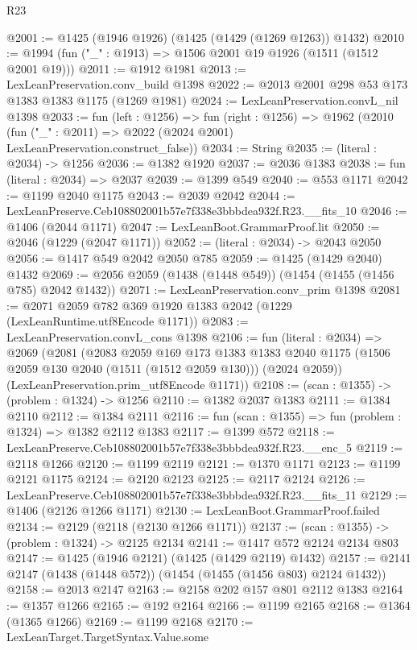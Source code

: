 \begin{lexlean}{R23}
\begin{coremodule}
@2001 := @1425 (@1946 @1926) (@1425 (@1429 (@1269 @1263)) @1432)
@2010 := @1994 (fun ("_" : @1913) => @1506 @2001 @19 @1926 (@1511 (@1512 @2001 @19)))
@2011 := @1912 @1981
@2013 := LexLeanPreservation.conv_build @1398
@2022 := @2013 @2001 @298 @53 @173 @1383 @1383 @1175 (@1269 @1981)
@2024 := LexLeanPreservation.convL_nil @1398
@2033 := fun (left : @1256) =>
  fun (right : @1256) =>
  @1962 (@2010 (fun ("_" : @2011) => @2022 (@2024 @2001) LexLeanPreservation.construct_false))
@2034 := String
@2035 := (literal : @2034) -> @1256
@2036 := @1382 @1920
@2037 := @2036 @1383
@2038 := fun (literal : @2034) => @2037
@2039 := @1399 @549
@2040 := @553 @1171
@2042 := @1199 @2040 @1175
@2043 := @2039 @2042
@2044 := LexLeanPreserve.Ceb108802001b57e7f338e3bbbdea932f.R23.__fits_10
@2046 := @1406 (@2044 @1171)
@2047 := LexLeanBoot.GrammarProof.lit
@2050 := @2046 (@1229 (@2047 @1171))
@2052 := (literal : @2034) -> @2043 @2050
@2056 := @1417 @549 @2042 @2050 @785
@2059 := @1425 (@1429 @2040) @1432
@2069 := @2056 @2059 (@1438 (@1448 @549)) (@1454 (@1455 (@1456 @785) @2042 @1432))
@2071 := LexLeanPreservation.conv_prim @1398
@2081 := @2071 @2059 @782 @369 @1920 @1383 @2042 (@1229 (LexLeanRuntime.utf8Encode @1171))
@2083 := LexLeanPreservation.convL_cons @1398
@2106 := fun (literal : @2034) =>
  @2069
    (@2081
      (@2083
        @2059
        @169
        @173
        @1383
        @1383
        @2040
        @1175
        (@1506 @2059 @130 @2040 (@1511 (@1512 @2059 @130)))
        (@2024 @2059))
      (LexLeanPreservation.prim_utf8Encode @1171))
@2108 := (scan : @1355) -> (problem : @1324) -> @1256
@2110 := @1382 @2037 @1383
@2111 := @1384 @2110
@2112 := @1384 @2111
@2116 := fun (scan : @1355) => fun (problem : @1324) => @1382 @2112 @1383
@2117 := @1399 @572
@2118 := LexLeanPreserve.Ceb108802001b57e7f338e3bbbdea932f.R23.__enc_5
@2119 := @2118 @1266
@2120 := @1199 @2119
@2121 := @1370 @1171
@2123 := @1199 @2121 @1175
@2124 := @2120 @2123
@2125 := @2117 @2124
@2126 := LexLeanPreserve.Ceb108802001b57e7f338e3bbbdea932f.R23.__fits_11
@2129 := @1406 (@2126 @1266 @1171)
@2130 := LexLeanBoot.GrammarProof.failed
@2134 := @2129 (@2118 (@2130 @1266 @1171))
@2137 := (scan : @1355) -> (problem : @1324) -> @2125 @2134
@2141 := @1417 @572 @2124 @2134 @803
@2147 := @1425 (@1946 @2121) (@1425 (@1429 @2119) @1432)
@2157 := @2141 @2147 (@1438 (@1448 @572)) (@1454 (@1455 (@1456 @803) @2124 @1432))
@2158 := @2013 @2147
@2163 := @2158 @202 @157 @801 @2112 @1383
@2164 := @1357 @1266
@2165 := @192 @2164
@2166 := @1199 @2165
@2168 := @1364 (@1365 @1266)
@2169 := @1199 @2168
@2170 := LexLeanTarget.TargetSyntax.Value.some

\end{coremodule}
\end{lexlean}
